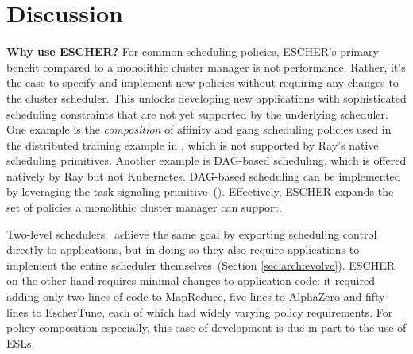 \section{Discussion}
\label{discussion}

\noindent\textbf{Why use ESCHER?}
For common scheduling policies, ESCHER’s primary benefit compared to a monolithic cluster manager is not performance. Rather, it's the ease to specify and implement new policies without requiring any changes to the cluster scheduler. This unlocks developing new applications with sophisticated scheduling constraints that are not yet supported by the underlying scheduler.
One example is the \emph{composition} of affinity and gang scheduling policies used in the distributed training example in , which is not supported by Ray's native scheduling primitives. Another example is DAG-based scheduling, which is offered natively by Ray but not Kubernetes.
DAG-based scheduling can be implemented by leveraging the task signaling primitive~(). Effectively, ESCHER expands the set of policies a monolithic cluster manager can support.


Two-level schedulers~\cite{omega, mesos} achieve the same goal by exporting scheduling control directly to applications, but in doing so they also require applications to implement the entire scheduler themselves~(Section \ref{sec:arch:evolve}). ESCHER on the other hand requires minimal changes to application code: it required adding only two lines of code to MapReduce, five lines to AlphaZero and fifty lines to EscherTune, each of which had widely varying policy requirements. For policy composition especially, this ease of development is due in part to the use of ESLs.

